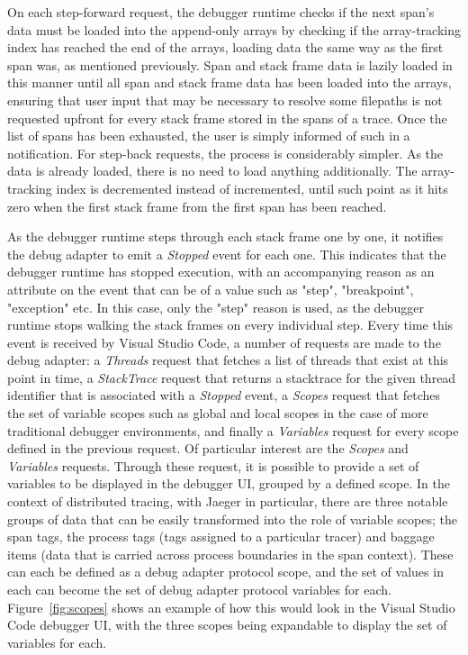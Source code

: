 \documentclass[12pt,pdftex,titlepage]{report}
\begin{document}
                On each step-forward request, the debugger runtime checks if the next span's data must be loaded into the append-only arrays by checking if the array-tracking index has reached the end of the arrays, loading data the same way
                as the first span was, as mentioned previously. Span and stack frame data is lazily loaded in this manner until all span and stack frame data has been loaded into the arrays, ensuring that user input that may be necessary to resolve
                some filepaths is not requested upfront for every stack frame stored in the spans of a trace. Once the list of spans has been exhausted, the user is simply informed of such in a notification. For step-back requests, the process is
                considerably simpler. As the data is already loaded, there is no need to load anything additionally. The array-tracking index is decremented instead of incremented, until such point as it hits zero when the first stack frame from the
                first span has been reached.

                As the debugger runtime steps through each stack frame one by one, it notifies the debug adapter to emit a \textit{Stopped} event for each one. This indicates that the debugger runtime has stopped execution, with an accompanying reason 
                as an attribute on the event that can be of a value such as "step", "breakpoint", "exception" etc. In this case, only the "step" reason is used, as the debugger runtime stops walking the stack frames on every individual step. Every time
                this event is received by Visual Studio Code, a number of requests are made to the debug adapter: a \textit{Threads} request that fetches a list of threads that exist at this point in time, a \textit{StackTrace} request that returns
                a stacktrace for the given thread identifier that is associated with a \textit{Stopped} event, a \textit{Scopes} request that fetches the set of variable scopes such as global and local scopes in the case of more traditional debugger
                environments, and finally a \textit{Variables} request for every scope defined in the previous request. Of particular interest are the \textit{Scopes} and \textit{Variables} requests. Through these request, it is possible to provide a 
                set of variables to be displayed in the debugger UI, grouped by a defined scope. In the context of distributed tracing, with Jaeger in particular, there are three notable groups of data that can be easily transformed into the role of
                variable scopes; the span tags, the process tags (tags assigned to a particular tracer) and baggage items (data that is carried across process boundaries in the span context). These can each be defined as a debug adapter protocol scope,
                and the set of values in each can become the set of debug adapter protocol variables for each. Figure~\ref{fig:scopes} shows an example of how this would look in the Visual Studio Code debugger UI, with the three scopes being expandable
                to display the set of variables for each. 
\end{document}
